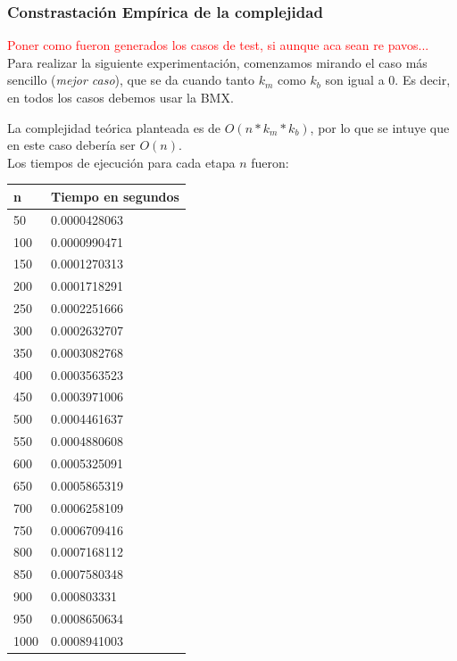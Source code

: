 \subsubsection{Constrastaci\'on Emp\'irica de la complejidad}

\textcolor{red}{Poner como fueron generados los casos de test, si aunque aca sean re pavos...}\\

Para realizar la siguiente experimentaci\'on, comenzamos mirando el caso m\'as sencillo (\emph{mejor caso}), que se da cuando tanto $k_m$ como $k_b$ son igual a 0. Es decir, en todos los casos debemos usar la BMX.
  
  La complejidad te\'orica planteada es de $O(n * k_m * k_b)$, por lo que se intuye que en este caso deber\'ia ser $O(n)$.\\
  
  Los tiempos de ejecuci\'on para cada etapa $n$ fueron:
  
  \begin{table}[htb]
  \centering
  \begin{tabular}[c]{|l|l|}

		\hline
n & Tiempo en segundos\\
		\hline
50	&	0.0000428063\\
		\hline
100	&	0.0000990471\\
		\hline
150	&	0.0001270313\\
		\hline
200	&	0.0001718291\\
		\hline
250	&	0.0002251666\\
		\hline
300	&	0.0002632707\\
		\hline
350	&	0.0003082768\\
		\hline
400	&	0.0003563523\\
		\hline
450	&	0.0003971006\\
		\hline
500	&	0.0004461637\\
		\hline
550	&	0.0004880608\\
		\hline
600	&	0.0005325091\\
		\hline
650	&	0.0005865319\\
		\hline
700	&	0.0006258109\\
		\hline
750	&	0.0006709416\\
		\hline
800	&	0.0007168112\\
		\hline
850	&	0.0007580348\\
		\hline
900	&	0.000803331\\
		\hline
950	&	0.0008650634\\
		\hline
1000	&	0.0008941003\\
		\hline

	\end{tabular}
	\end{table}
	
